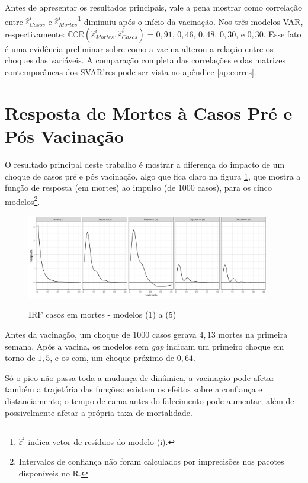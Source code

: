 \documentclass[
    article,
	12pt,				%
	oneside,			%
	a4paper,			%
	english,			%
	brazil,				%
	hyperref = {colorlinks, citecolor=c1d, linkcolor=c2d, urlcolor=c3d, colorlinks}
	]{abntex2}
\newcounter{j}
\begin{document}
Antes de apresentar os resultados principais, vale a pena mostrar como correlação entre $\hat{\varepsilon}^i_{Casos}$ e $\hat{\varepsilon}^i_{Mortes}$\footnote{$\hat{\varepsilon}^i$ indica vetor de resíduos do modelo (i).} diminuiu após o início da vacinação. Nos três modelos VAR, respectivamente: $\mathbb{COR}(\hat{\varepsilon}^i_{Mortes}, \hat{\varepsilon}^i_{Casos}) = 0,91$, $0,46$, $0,48$, $0,30$, e $0,30$. Esse fato é uma evidência preliminar sobre como a vacina alterou a relação entre os choques das variáveis. A comparação completa das correlações e das matrizes contemporâneas dos SVAR'res pode ser vista no apêndice \ref{ap:corres}.


\section{Resposta de Mortes à Casos Pré e Pós Vacinação}\label{sec:res1}

O resultado principal deste trabalho é mostrar a diferença do impacto de um choque de casos pré e pós vacinação, algo que fica claro na figura \ref{fig:IRF BaA}, que mostra a função de resposta (em mortes) ao impulso (de $1000$ casos), para os cinco modelos\footnote{Intervalos de confiança não foram calculados por imprecisões nos pacotes disponíveis no R.}.

\begin{figure}[H]
    \centering
    \caption{IRF casos em mortes - modelos (1) a (5)}
    \includegraphics[width = 0.95\textwidth]{Figures/res1_irfs.png}
    \label{fig:IRF BaA}
\end{figure}

Antes da vacinação, um choque de $1000$ casos gerava $4,13$ mortes na primeira semana. Após a vacina, os modelos sem \textit{gap} indicam um primeiro choque em torno de $1,5$, e os com, um choque próximo de $0,64$.

Só o pico não passa toda a mudança de dinâmica, a vacinação pode afetar também a trajetória das funções: existem os efeitos sobre a confiança e distanciamento; o tempo de cama antes do falecimento pode aumentar; além de possivelmente afetar a própria taxa de mortalidade.
\end{document}
